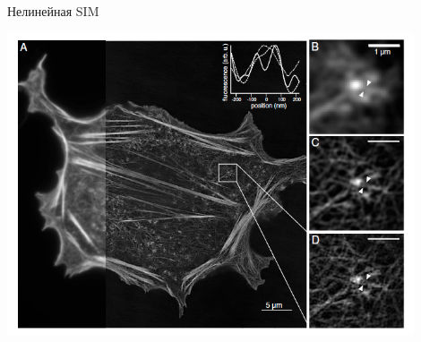 \documentclass[9pt, compress, xcolor=table]{beamer}
\begin{document}
\begin{frame}{Нелинейная SIM}
\begin{center}
\includegraphics[width=0.9\textwidth]{nlsim12}
\end{center}
\end{frame}
\end{document}
